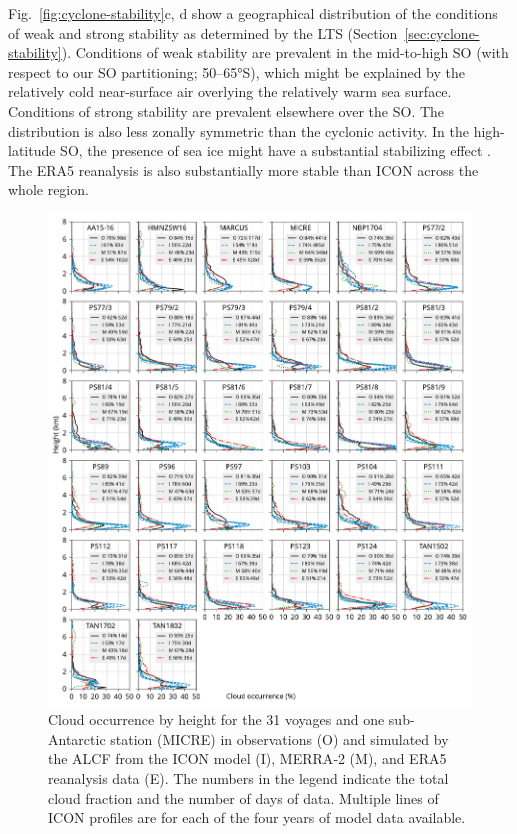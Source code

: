 \documentclass[draft]{agujournal2019}
\begin{document}
Fig.~\ref{fig:cyclone-stability}c, d show a geographical distribution of the conditions of weak and strong stability as determined by the LTS (Section~\ref{sec:cyclone-stability}). Conditions of weak stability are prevalent in the mid-to-high SO (with respect to our SO partitioning; 50--65°S), which might be explained by the relatively cold near-surface air overlying the relatively warm sea surface. Conditions of strong stability are prevalent elsewhere over the SO. The distribution is also less zonally symmetric than the cyclonic activity. In the high-latitude SO, the presence of sea ice might have a substantial stabilizing effect \cite{knight2024}. The ERA5 reanalysis is also substantially more stable than ICON across the whole region.

\begin{figure}[p!]
\centerline{
\includegraphics[width=1.06\textwidth]{img/cloud_occurrence_panel.pdf}
}
\caption{
Cloud occurrence by height for the 31 voyages and one sub-Antarctic station (MICRE) in observations (O) and simulated by the ALCF from the ICON model (I), MERRA‐2 (M), and ERA5 reanalysis data (E). The numbers in the legend indicate the total cloud fraction and the number of days of data. Multiple lines of ICON profiles are for each of the four years of model data available.
}
\label{fig:cloud-occurrence-panel}
\end{figure}
\end{document}
